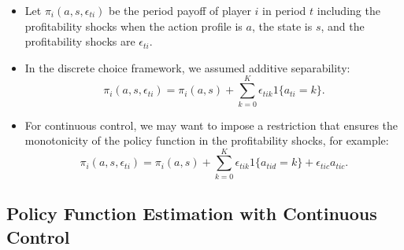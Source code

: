 \documentclass[
]{book}
\providecommand{\tightlist}{%
  \setlength{\itemsep}{0pt}\setlength{\parskip}{0pt}}
\begin{document}
\begin{itemize}
\tightlist
\item
  Let \(\pi_i(a, s, \epsilon_{ti})\) be the period payoff of player \(i\) in period \(t\) including the profitability shocks when the action profile is \(a\), the state is \(s\), and the profitability shocks are \(\epsilon_{ti}\).
\item
  In the discrete choice framework, we assumed additive separability:
  \begin{equation}
  \pi_i(a, s, \epsilon_{ti}) = \pi_i(a, s) + \sum_{k = 0}^K \epsilon_{tik}1\{a_{ti} = k\}.
  \end{equation}
\item
  For continuous control, we may want to impose a restriction that ensures the monotonicity of the policy function in the profitability shocks, for example:
  \begin{equation}
  \pi_i(a, s, \epsilon_{ti}) = \pi_i(a, s) + \sum_{k = 0}^K \epsilon_{tik} 1\{a_{tid} = k\} + \epsilon_{tic} a_{tic}.
  \end{equation}
\end{itemize}

\hypertarget{policy-function-estimation-with-continuous-control}{%
\subsection{Policy Function Estimation with Continuous Control}\label{policy-function-estimation-with-continuous-control}}
\end{document}
